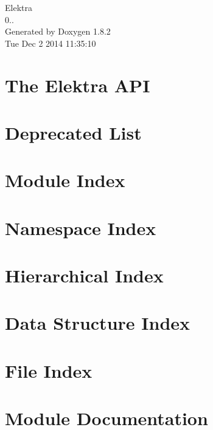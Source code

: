 \documentclass{book}
\begin{document}
\hypersetup{pageanchor=false,citecolor=blue}
\begin{titlepage}
\vspace*{7cm}
\begin{center}
{\Large Elektra \\[1ex]\large 0.. }\\
\vspace*{1cm}
{\large Generated by Doxygen 1.8.2}\\
\vspace*{0.5cm}
{\small Tue Dec 2 2014 11:35:10}\\
\end{center}
\end{titlepage}
\clearemptydoublepage
{}
\tableofcontents
\clearemptydoublepage
{}
\hypersetup{pageanchor=true,citecolor=blue}
\chapter{The Elektra A\-P\-I}
\label{index}\hypertarget{index}{}
\chapter{Deprecated List}
\label{deprecated}
\hypertarget{deprecated}{}

\chapter{Module Index}

\chapter{Namespace Index}

\chapter{Hierarchical Index}

\chapter{Data Structure Index}

\chapter{File Index}

\chapter{Module Documentation}








\end{document}
